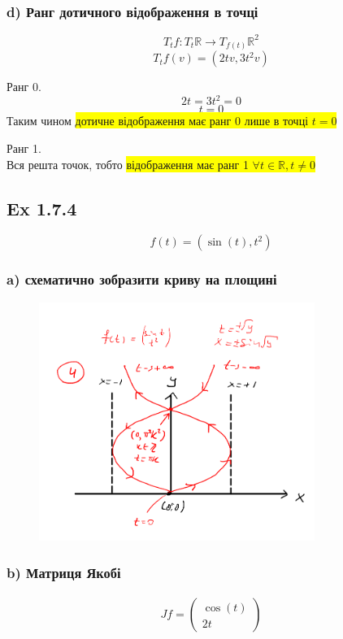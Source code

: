 \documentclass[10pt, a4paper]{article} %
\newcommand{\R}{\mathbb{R}}
\begin{document}
\subsubsection*{d) Ранг дотичного відображення в точці}
\[T_{t}f: T_{t}\R \to T_{f(t)}\R^2\]
\[T_{t}f(v) = (2tv, 3t^2v)\]

Ранг 0.
\[2t = 3t^2 = 0\]
\[t = 0\]
Таким чином \colorbox{yellow}{дотичне відображення має ранг 0 лише в точці $t=0$}

Ранг 1.\\
Вся решта точок, тобто \colorbox{yellow}{відображення має ранг 1 $\forall t \in \R, t\ne 0$}



\subsection*{Ex 1.7.4}
\[f(t) = (\sin(t), t^2)\]

\subsubsection*{a) схематично зобразити криву на площині}
\begin{figure}[h]
    \includegraphics[width=0.8\textwidth]{1.7.4.png}
    \centering
\end{figure}


\subsubsection*{b) Матриця Якобі}
\begin{align*}
    Jf = \begin{pmatrix}
        \cos(t) \\ 2t
    \end{pmatrix}
\end{align*}
\end{document}
